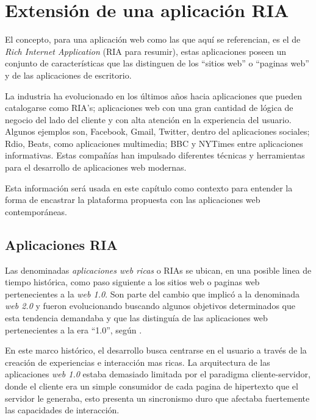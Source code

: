 
\chapter{Extensi\'{o}n de una aplicaci\'{o}n RIA} %

\label{ch:ria_extension} 

El concepto, para una aplicación web como las que aquí se referencian, es el de \emph{Rich Internet Application} (RIA para resumir), estas aplicaciones poseen un conjunto de características que las distinguen de los ``sitios web'' o ``paginas web'' y de las aplicaciones de escritorio. 

La industria ha evolucionado en los últimos años hacia aplicaciones que pueden catalogarse como RIA's; aplicaciones web con una gran cantidad de lógica de negocio del lado del cliente y con alta atención en la experiencia del usuario. Algunos ejemplos son, Facebook, Gmail, Twitter, dentro del aplicaciones sociales; Rdio, Beats, como aplicaciones multimedia; BBC y NYTimes entre aplicaciones informativas. Estas compañías han impulsado diferentes técnicas y herramientas para el desarrollo de aplicaciones web modernas. 

Esta información será usada en este capítulo como contexto para entender la forma de encastrar la plataforma propuesta con las aplicaciones web contemporáneas.

\section{Aplicaciones RIA} \label{sec:extension_ria_intro}

Las denominadas \emph{aplicaciones web ricas} o RIAs se ubican, en una posible linea de tiempo histórica, como paso siguiente a los sitios web o paginas web pertenecientes a la \emph{web 1.0}. Son parte del cambio que implicó a la denominada \emph{web 2.0} y fueron evolucionando buscando algunos objetivos determinados que esta tendencia demandaba y que las distinguía de las aplicaciones web pertenecientes a la era ``1.0'', según \citet{Farrell2007}. 

En este marco histórico, el desarrollo busca centrarse en el usuario a través de la creación de experiencias e interacción mas ricas. La arquitectura de las aplicaciones \emph{web 1.0} estaba demasiado limitada por el paradigma cliente-servidor, donde el cliente era un simple consumidor de cada pagina de hipertexto que el servidor le generaba, esto presenta un sincronismo duro que afectaba fuertemente las capacidades de interacción.

